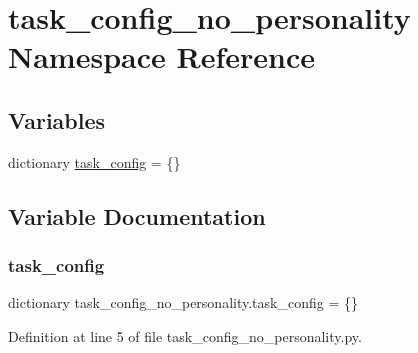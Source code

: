 \hypertarget{namespacetask__config__no__personality}{}\section{task\+\_\+config\+\_\+no\+\_\+personality Namespace Reference}
\label{namespacetask__config__no__personality}
\subsection*{Variables}
\begin{DoxyCompactItemize}
\item 
dictionary \hyperlink{namespacetask__config__no__personality_ae81bb70aed329c6299dad9f5ef42fa1e}{task\+\_\+config} = \{\}
\end{DoxyCompactItemize}


\subsection{Variable Documentation}
\mbox{\label{namespacetask__config__no__personality_ae81bb70aed329c6299dad9f5ef42fa1e}} 
\subsubsection{\texorpdfstring{task\+\_\+config}{task\_config}}
{\footnotesize\ttfamily dictionary task\+\_\+config\+\_\+no\+\_\+personality.\+task\+\_\+config = \{\}}



Definition at line 5 of file task\+\_\+config\+\_\+no\+\_\+personality.\+py.

